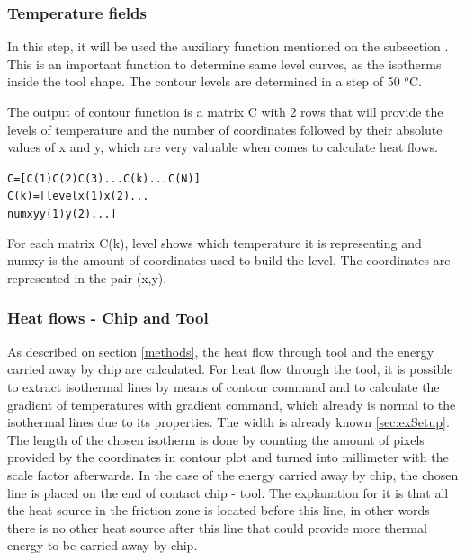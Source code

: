 		\subsubsection{Temperature fields}

			In this step, it will be used the auxiliary function mentioned on the subsection . This is an important function to determine same level curves, as the isotherms inside the tool shape. The contour levels are determined in a step of 50 $^{o}$C.

		
			

			The output of contour function is a matrix C with 2 rows that will provide the levels of temperature and the number of coordinates followed by their absolute values of x and y, which are very valuable when comes to calculate heat flows.

			\begin{mdframed}[backgroundcolor=lightgray!25!]
			\begin{alltt}\fontsize{9pt}{8pt}\selectfont
			C    =  [C(1) C(2) C(3) ...C(k)... C(N)]
			C(k) =  [level x(1) x(2)...
			         numxy y(1) y(2)...]
			\end{alltt}
			\end{mdframed}
			
			For each matrix C(k), level shows which temperature it is representing and numxy is the amount of coordinates used to build the level. The coordinates are represented in the pair (x,y).

		\subsubsection{Heat flows - Chip and Tool}
		\label{heatflows}
			As described on section \ref{methods}, the heat flow through tool and the energy carried away by chip are calculated. For heat flow through the tool, it is possible to extract isothermal lines by means of contour command and to calculate the gradient of temperatures  with gradient command, which already is normal to the isothermal lines due to its properties. The width is already known \ref{sec:exSetup}. The length of the chosen isotherm is done by counting the amount of pixels provided by the coordinates in contour plot and turned into millimeter with the scale factor afterwards.
			In the case of the energy carried away by chip, the chosen line is placed on the end of contact chip - tool. The explanation for it is that all the heat source in the friction zone is located before this line, in other words there is no other heat source after this line that could provide more thermal energy to be carried away by chip.		

